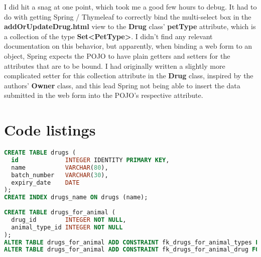 \documentclass[12pt, a4paper]{article}
\begin{document}
I did hit a snag at one point, which took me a good few hours to debug. It had to do with getting Spring / Thymeleaf to correctly bind the multi-select box in the \textbf{addOrUpdateDrug.html} view to the \textbf{Drug} class' \textbf{petType} attribute, which is a collection of the type \textbf{Set\textless PetType\textgreater}. I didn't find any relevant documentation on this behavior, but apparently, when binding a web form to an object, Spring expects the POJO to have plain getters and setters for the attributes that are to be bound. I had originally written a slightly more complicated setter for this collection attribute in the \textbf{Drug} class, inspired by the authors' \textbf{Owner} class, and this lead Spring not being able to insert the data submitted in the web form into the POJO's respective attribute.

\newpage
\section{Code listings}

\begin{lstlisting}[language=SQL, title='schema.sql']
CREATE TABLE drugs (
  id             INTEGER IDENTITY PRIMARY KEY,
  name           VARCHAR(80),
  batch_number   VARCHAR(30),
  expiry_date    DATE
);
CREATE INDEX drugs_name ON drugs (name);
 
CREATE TABLE drugs_for_animal (
  drug_id        INTEGER NOT NULL,
  animal_type_id INTEGER NOT NULL
);
ALTER TABLE drugs_for_animal ADD CONSTRAINT fk_drugs_for_animal_types FOREIGN KEY (animal_type_id) REFERENCES types (id);
ALTER TABLE drugs_for_animal ADD CONSTRAINT fk_drugs_for_animal_drug FOREIGN KEY (drug_id) REFERENCES drugs (id);
\end{lstlisting}
\end{document}
